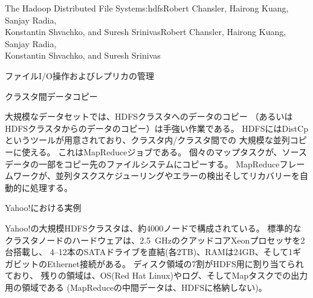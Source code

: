 \begin{aosachaptertoc}{The Hadoop Distributed File System}{s:hdfs}{Robert Chansler, Hairong Kuang, Sanjay Radia, \\ Konstantin Shvachko, and Suresh Srinivas}{Robert Chansler, Hairong Kuang, Sanjay Radia, \\ \hspace*{0.9cm} Konstantin Shvachko, and Suresh Srinivas}
\begin{aosasect1}{ファイルI/O操作およびレプリカの管理}
\begin{aosasect2}{クラスタ間データコピー}

大規模なデータセットでは、HDFSクラスタへのデータのコピー
（あるいはHDFSクラスタからのデータのコピー）は手強い作業である。
HDFSにはDistCpというツールが用意されており、クラスタ内/クラスタ間での
大規模な並列コピーに使える。
これはMapReduceジョブである。
個々のマップタスクが、ソースデータの一部をコピー先のファイルシステムにコピーする。
MapReduceフレームワークが、並列タスクスケジューリングやエラーの検出そしてリカバリーを自動的に処理する。

\end{aosasect2}

\end{aosasect1}

\begin{aosasect1}{Yahoo!における実例}

Yahoo!の大規模HDFSクラスタは、約4000ノードで構成されている。
標準的なクラスタノードのハードウェアは、2.5~GHzのクアッドコアXeonプロセッサを2台搭載し、
4--12本のSATAドライブを直結(各2TB)、RAMは24GB、そして1ギガビットのEthernet接続がある。
ディスク領域の7割がHDFS用に割り当てられており、
残りの領域は、OS(Red Hat Linux)やログ、そしてMapタスクでの出力用の領域である
(MapReduceの中間データは、HDFSに格納しない)。


\end{aosasect1}
\end{aosachaptertoc}
